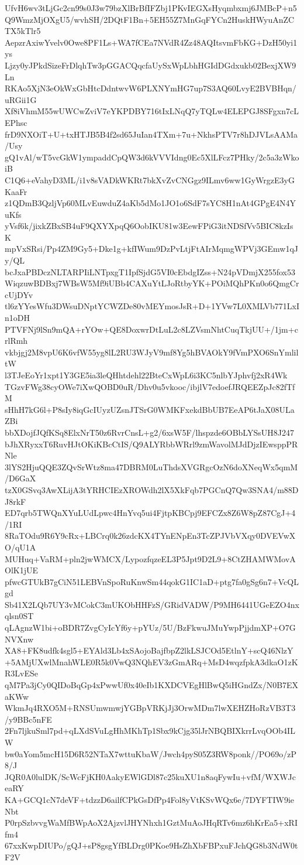 UfvH6wv3tLjGc2cn99s0J3w79bzXlBrBfIFZbj1PKvIEGXsHyqmbxmj6JMBcP+n5
Q9WmzMjOXgU5/wvhSH/2DQtF1Bn+5EH55Z7MnGqFYCn2HuskHWyuAnZCTX5kTlr5
AepzrAxiwYvelv0Owe8PF1Ls+WA7fCEa7NVdR4Zz48AQItsvmFbKG+DzH50yi1ys
Ljzy0yJPkdSizeFrDlqhTw3pGGACQqcfaUySxWpLbhHGIdDGdxukb02BexjXW9Ln
RKAo5XjN3eOkWxGbHtcDdntwvW6PLXNYmHG7up7S3AQ60LvyE2BVBHqn/uRGii1G
Xf8iVhmM55wUWCwZviV7eYKPDBY716tIxLNqQ7yTQLw4ELEPGJ8SFgxn7cLEPhsc
frD9NXOiT+U+txHTJB5B4f2sd65JuIan4TXm+7u+NkhsPTV7r8hDJVLsAAMa/Usy
gQ1vAl/wT5vcGkW1ympaddCpQW3d6kVVVIdng0Ec5XlLFcz7PHky/2c5a3zWkoiB
C1Q6+eVahyD3ML/i1v8sVADkWKRt7bkXvZvCNGgz9ILmv6ww1GyWrgzE3yGKaaFr
z1QDmB3QzljVp60MLvEuwduZ4aKb5dMo1JO1o6SdF7sYC8H1nAt4GPgE4N4YuKfs
yVsf6k/jixkZBxSB4uF9QXYXpqQ6OobIKU81w3EewFPiG3itNDSfVv5BIC8kzIsK
mpVxSRsi/Pp4ZM9Gy5+Dke1g+kfIWum9DzPvLtjFtAIrMqmgWPVj3GEmw1qJy/QL
bcJxaPBDczNLTARPIiLNTpxgT1IpfSjdG5VI0cEbdgIZss+N24pVDmjX255fox53
WiqzuwBDBxj7WBsW5Mf9iUBb4CAXuYtLJoRtbyYK+POiMQhPKn0o6QmgCrcUjDYv
tl6zYYesWfu3DWsuDNptYCWZDe80vMEYmosJsR+D+1YVw7L0XMLVb771LxIn1oDH
PTVFNj9lSn9mQA+rYOw+QE8DoxwrDtLuL2c8LZVsmNhtCuqTkjUU+/1jm+crlRmh
vkbjgj2M8vpU6K6vfW55yg8lL2RU3WJyV9mf8Yg5hBVAOkY9fVmPXO6SnYmliltW
l3TJeEoYr1xpt1Y3GE5ia3leQHhtdehl22BteCxWpL6i3KC5nlbYJphvfj2xR4Wk
TGzvFWg38cyOWe7iXwQOBD0uR/Dhv0u5vkooc/ibjlV7edoefJRQEEZpJc82fTfM
sHhH7kG6l+P8sIy8iqGcIUyzUZsnJTSrG0WMKFxekdBbUB7EeAP6tJaX08ULaZBi
bbXDojfJQfKSq8ElxNrT50z6RvrCnsL+g2/6xsW5F/lhspzde6OBbLYSsUH8J247
bJhXRyxxT6RuvHJtOKiKBcCtIS/Q9ALYRbbWRrl9zmWavolMJdDjzIEwsppPRNle
3lYS2HjuQQE3ZQvSrWtz8ma47DBRM0LuThdsXVGRgcOzN6doXNeqWx5qmM/D6GaX
tzX0GSvq3AwXLijA3tYRHCIEzXROWdh2lX5XkFqb7PGCnQ7Qw3SNA4/m88DJ8rkF
ED7qrb5TWQnXYuLUdLpwc4HnYvq5ui4FjtpKBCpj9EFCZx8Z6W8pZ87CgJ+4/1RI
8RaTOdu9R6Y9cRx+LBCrq0k26zdcKX4TYnENpEn3TcZPJVbVXqy0DVEVwXO/qU1A
MUHuq+VaRM+pln2jwWMCX/LypozfqzeEL3P5Jpt9D2L9+8CtZHAMWMovAOlK1jUE
pfwcGTUkB7gCiN51LEBVnSpoRuKnwSm44qokG1IC1aD+ptg7fa0gSg6n7+VcQLgd
Sb41X2LQb7UY3vMCokC3mUKObHHFzS/GRidVADW/P9MH6441UGeEZO4nxqlsn0ST
qLAgnzW1bi+oBDR7ZvgCyIcYf6y+pYUz/5U/BzFkwuJMuYwpPjjdmXP+O7GNVXnw
XA8+FK8udfk4sgl5+EYAld3Lb4xSAojoBajfbpZ2lkLSJCOd5EtlnY+scQ46NlzY
+5AMjUXwlMnahWLE0R5k0VwQ3NQhEV3zGmARq+MsD4wqzfpkA3dkaO1zKR3LvESe
qM7Pa3jCy0QIDoBqGp4xPwwUf0x40eIb1KXDCVEgHlBwQ5iHGndZx/N0B7EXaKWw
WkmJq4RXO5M+RNSUmwmwjYGBpVRKjJj3OrwMDm7lwXEHZHoRzVB3T3/y9BBc5nFE
2Fn7ljkuSml7pd+qLXdSVuLgHhMKhTp1Sbx9kCjg35lJrNBQBIXkrrLvqOOb4ILW
bw0aYom5mcH15D6R52NTaX7wttuKbaW/Jwch4pyS05Z3RW8ponk//PO69o/zP8/J
JQR0A0lulDK/ScWcFjKH0AakyEWlGDl87c25kuXU1n8aqFywIu+vfM/WXWJceaRY
KA+GCQ1cN7deVF+tdzzD6ailfCPkGsDfPp4Fol8yVtKSvWQx6e/7DYFTIW9ieNbt
P0rpSzbvvgWaMfBWpAoX2AjzvlJHYNhxh1GztMuAoJHqRTv6mz6hKrEa5+xRIfm4
67xxKwpDIUPo/gQJ+sP8gsgYfBLDrg0PKoe9HsZhXbFBPxuFJchQG8b3NdW0tF2V
